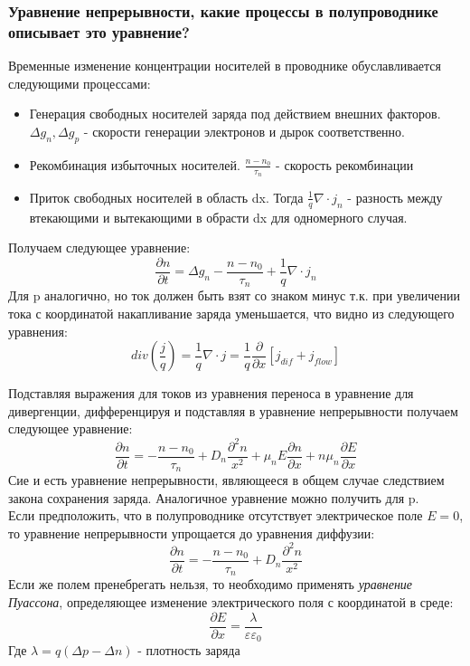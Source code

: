 \subsubsection{Уравнение непрерывности, какие процессы в полупроводнике описывает это уравнение?}
Временные изменение концентрации носителей в проводнике обуславливается следующими процессами:
\begin{itemize}
\item Генерация свободных носителей заряда под действием внешних факторов. $\Delta g_n , \Delta g_p$ - скорости генерации электронов и дырок соответственно.
\item Рекомбинация избыточных носителей. $\frac{n - n_0}{\tau_n}$ - скорость рекомбинации
\item Приток свободных носителей в область dx. Тогда $\frac{1}{q}\nabla \cdot j_{n}$ - разность между втекающими и вытекающими в обрасти dx для одномерного случая.
\end{itemize}

Получаем следующее уравнение:
\begin{equation}
\frac{\partial n}{ \partial t} = \Delta g_n - \frac{n - n_0}{\tau_n} + \frac{1}{q} \nabla \cdot j_{n}
\end{equation}
Для p аналогично, но ток должен быть взят со знаком минус т.к. при увеличении тока с координатой накапливание заряда уменьшается, что видно из следующего уравнения:
\begin{equation}
div(\frac{j}{q}) = \frac{1}{q} \nabla \cdot j = \frac{1}{q}\frac{\partial}{ \partial x} \left[ j_{dif} + j_{flow} \right]
\end{equation}

Подставляя выражения для токов из уравнения переноса в уравнение для дивергенции, дифференцируя и подставляя в уравнение непрерывности получаем следующее уравнение:
\begin{equation}
\frac{\partial n}{ \partial t} = -  \frac{n - n_0}{\tau_n}  + D_n \frac{\partial^2 n }{x^2} + \mu_n E \frac{\partial n}{\partial x} + n \mu_n \frac{\partial E}{\partial x}
\end{equation}
Сие и есть уравнение непрерывности, являющееся в общем случае следствием закона сохранения заряда. Аналогичное уравнение можно получить для p.\\

Если предположить, что в полупроводнике отсутствует электрическое поле $E=0$, то уравнение непрерывности упрощается до уравнения диффузии:
\begin{equation}
\frac{\partial n}{ \partial t} = -  \frac{n - n_0}{\tau_n}  + D_n \frac{\partial^2 n }{x^2}
\end{equation}
Если же полем пренебрегать нельзя, то необходимо применять\textit{ уравнение Пуассона}, определяющее изменение электрического поля с координатой в среде:
\begin{equation}
\frac{\partial E}{\partial x} = \frac{\lambda}{\varepsilon \varepsilon_0}
\end{equation}
Где $\lambda = q (\Delta p - \Delta n)$ - плотность заряда



\pagebreak
